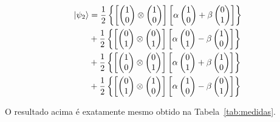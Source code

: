 \begin{align}
\ket{\psi_2} &=\frac{1}{2} \left\{ \left[\begin{pmatrix}
1 \\
0
\end{pmatrix} \otimes \begin{pmatrix}
1 \\
0
\end{pmatrix}\right] \left[\alpha \begin{pmatrix}
1 \\
0
\end{pmatrix} + \beta \begin{pmatrix}
0 \\
1
\end{pmatrix}\right]\right\} \nonumber \\
&+\frac{1}{2} \left\{ \left[\begin{pmatrix}
0 \\
1
\end{pmatrix} \otimes \begin{pmatrix}
0 \\
1
\end{pmatrix}\right] \left[\alpha \begin{pmatrix}
0 \\
1
\end{pmatrix} - \beta \begin{pmatrix}
1 \\
0
\end{pmatrix}\right]\right\} \nonumber \\
&+\frac{1}{2} \left\{\left[ \begin{pmatrix}
1 \\
0
\end{pmatrix} \otimes \begin{pmatrix}
0 \\
1
\end{pmatrix}\right] \left[\alpha \begin{pmatrix}
0 \\
1
\end{pmatrix} + \beta \begin{pmatrix}
1 \\
0
\end{pmatrix}\right]\right\} \nonumber \\
&+\frac{1}{2} \left\{ \left[ \begin{pmatrix}
0 \\
1
\end{pmatrix} \otimes \begin{pmatrix}
1 \\
0
\end{pmatrix}\right] \left[\alpha \begin{pmatrix}
1 \\
0
\end{pmatrix} - \beta \begin{pmatrix}
0 \\
1
\end{pmatrix}\right] \right\}
\end{align}

O resultado acima é exatamente mesmo obtido na Tabela~\ref{tab:medidas}.

